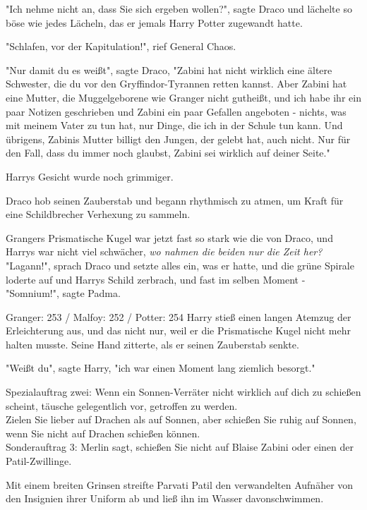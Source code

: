 {"Ich nehme nicht an, dass Sie sich ergeben wollen?", sagte Draco und lächelte so böse wie jedes Lächeln, das er jemals Harry Potter zugewandt hatte.

"Schlafen, vor der Kapitulation!", rief General Chaos.

"Nur damit du es weißt", sagte Draco, "Zabini hat nicht wirklich eine ältere Schwester, die du vor den Gryffindor-Tyrannen retten kannst. Aber Zabini hat eine Mutter, die Muggelgeborene wie Granger nicht gutheißt, und ich habe ihr ein paar Notizen geschrieben und Zabini ein paar Gefallen angeboten - nichts, was mit meinem Vater zu tun hat, nur Dinge, die ich in der Schule tun kann. Und übrigens, Zabinis Mutter billigt den Jungen, der gelebt hat, auch nicht. Nur für den Fall, dass du immer noch glaubst, Zabini sei wirklich auf deiner Seite."

Harrys Gesicht wurde noch grimmiger.

Draco hob seinen Zauberstab und begann rhythmisch zu atmen, um Kraft für eine Schildbrecher Verhexung zu sammeln.

Grangers Prismatische Kugel war jetzt fast so stark wie die von Draco, und Harrys war nicht viel schwächer, \emph{wo nahmen die beiden nur die Zeit her?}\\ "Lagann!", sprach Draco und setzte alles ein, was er hatte, und die grüne Spirale loderte auf und Harrys Schild zerbrach, und fast im selben Moment -\\ "Somnium!", sagte Padma.

Granger: 253 / Malfoy: 252 / Potter: 254 Harry stieß einen langen Atemzug der Erleichterung aus, und das nicht nur, weil er die Prismatische Kugel nicht mehr halten musste. Seine Hand zitterte, als er seinen Zauberstab senkte.

"Weißt du", sagte Harry, "ich war einen Moment lang ziemlich besorgt."

Spezialauftrag zwei: Wenn ein Sonnen-Verräter nicht wirklich auf dich zu schießen scheint, täusche gelegentlich vor, getroffen zu werden.\\ Zielen Sie lieber auf Drachen als auf Sonnen, aber schießen Sie ruhig auf Sonnen, wenn Sie nicht auf Drachen schießen können.\\ Sonderauftrag 3: Merlin sagt, schießen Sie nicht auf Blaise Zabini oder einen der Patil-Zwillinge.

Mit einem breiten Grinsen streifte Parvati Patil den verwandelten Aufnäher von den Insignien ihrer Uniform ab und ließ ihn im Wasser davonschwimmen.

}
